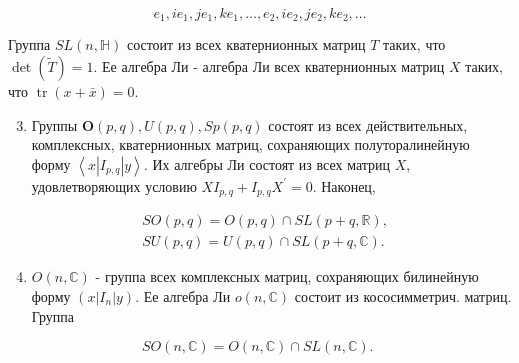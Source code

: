 \documentclass[10pt]{article}
\begin{document}
\[

e_{1}, i e_{1}, j e_{1}, k e_{1}, \ldots, e_{2}, i e_{2}, j e_{2}, k e_{2}, \ldots

\]



Группа $S L(n, \mathbb{H})$ состоит из всех кватернионных матриц $T$ таких, что $\operatorname{det}(\widetilde{T})=1$. Ее алгебра Ли - алгебра Ли всех кватернионных матриц $X$ таких, что $\operatorname{tr}(x+\bar{x})=0$.



\begin{enumerate}

  \setcounter{enumi}{2}

  \item Группы $\boldsymbol{O}(p, q), U(p, q), S p(p, q)$ состоят из всех действительных, комплексных, кватернионных матриц, сохраняющих полуторалинейную форму $\left\langle x\left|I_{p, q}\right| y\right\rangle$. Их алгебры Ли состоят из всех матриц $X$, удовлетворяющих условию $X I_{p, q}+I_{p, q} X^{\prime}=0$. Наконец,

\end{enumerate}



\[

\begin{aligned}

& S O(p, q)=O(p, q) \cap S L(p+q, \mathbb{R}), \\

& S U(p, q)=U(p, q) \cap S L(p+q, \mathbb{C}) .

\end{aligned}

\]



\begin{enumerate}

  \setcounter{enumi}{3}

  \item $O(n, \mathbb{C})$ - группа всех комплексных матриц, сохраняющих билинейную форму $\left(x\left|I_{n}\right| y\right)$. Ее алгебра Ли $o(n, \mathbb{C})$ состоит из кососимметрич. матриц. Группа

\end{enumerate}



\[

S O(n, \mathbb{C})=O(n, \mathbb{C}) \cap S L(n, \mathbb{C}) \text {. }

\]
\end{document}
